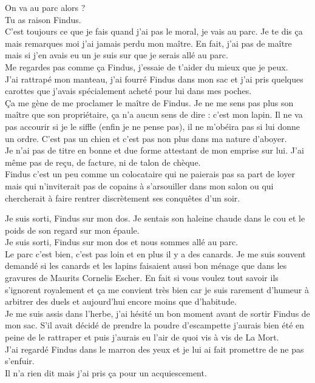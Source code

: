 On va au parc alors ? \\

Tu as raison Findus. \\
C'est toujours ce que je fais quand j'ai pas le moral, je vais au parc. Je te dis ça mais remarques moi j'ai jamais perdu mon maître. En fait, j'ai pas de maître mais si j'en avais eu un je suis sur que je serais allé au parc.\\
Me regardes pas comme ça Findus, j'essaie de t'aider du mieux que je peux. \\

J'ai rattrapé mon manteau, j'ai fourré Findus dans mon sac et j'ai pris quelques carottes que j'avais spécialement acheté pour lui dans mes poches. \\

Ça me gène de me proclamer le maître de Findus. Je ne me sens pas plus son maître que son propriétaire, ça n'a aucun sens de dire : c'est mon lapin. Il ne va pas accourir si je le siffle (enfin je ne pense pas), il ne m'obéira pas si lui donne un ordre. C'est pas un chien et c'est pas non plus dans ma nature d'aboyer. \\
Je n'ai pas de titre en bonne et due forme attestant de mon emprise sur lui. J'ai même pas de reçu, de facture, ni de talon de chèque. \\
Findus c'est un peu comme un colocataire qui ne paierais pas sa part de loyer mais qui n'inviterait pas de copains à s'arsouiller dans mon salon ou qui chercherait à faire rentrer discrètement ses conquêtes d'un soir.

Je suis sorti, Findus sur mon dos. Je sentais son haleine chaude dans le cou et le poids de son regard sur mon épaule. \\
Je suis sorti, Findus sur mon dos et nous sommes allé au parc. \\

Le parc c'est bien, c'est pas loin et en plus il y a des canards. Je me suis souvent demandé si les canards et les lapins faisaient aussi bon ménage que dans les gravures de Maurits Cornelis Escher. En fait si vous voulez tout savoir ils s'ignorent royalement et ça me convient très bien car je suis rarement d'humeur à arbitrer des duels et aujourd'hui encore moins que d'habitude. \\

Je me suis assis dans l'herbe, j'ai hésité un bon moment avant de sortir Findus de mon sac. S'il avait décidé de prendre la poudre d'escampette j'aurais bien été en peine de le rattraper et puis j'aurais eu l'air de quoi vis à vis de La Mort. \\
J'ai regardé Findus dans le marron des yeux et je lui ai fait promettre de ne pas s'enfuir. \\
Il n'a rien dit mais j'ai pris ça pour un acquiescement.\\

